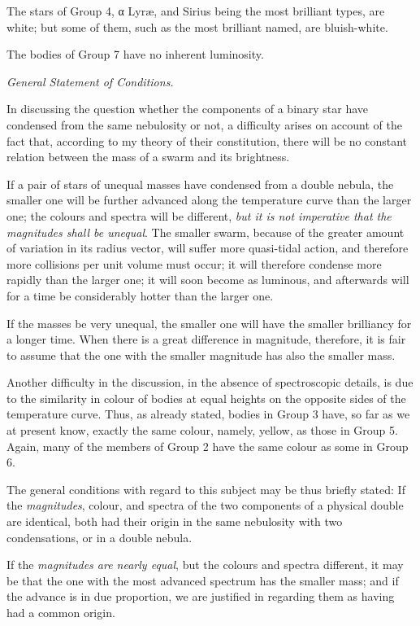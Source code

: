 \documentclass[a4paper, 12pt, oneside, polutonikogreek, english]{article}
\begin{document}
The stars of Group 4, α Lyræ, and Sirius being the most brilliant types, are white; but some of them, such as the most brilliant named, are bluish-white.

The bodies of Group 7 have no inherent luminosity.

\emph{General Statement of Conditions.}

In discussing the question whether the components of a binary star have condensed from the same nebulosity or not, a difficulty arises on account of the fact that, according to my theory of their constitution, there will be no constant relation between the mass of a swarm and its brightness.

If a pair of stars of unequal masses have condensed from a double nebula, the smaller one will be further advanced along the temperature curve than the larger one; the colours and spectra will be different, \emph{but it is not imperative that the magnitudes shall be unequal}. The smaller swarm, because of the greater amount of variation in its radius vector, will suffer more quasi-tidal action, and therefore more collisions per unit volume must occur; it will therefore condense more rapidly than the larger one; it will soon become as luminous, and afterwards will for a time be considerably hotter than the larger one.

If the masses be very unequal, the smaller one will have the smaller brilliancy for a longer time. When there is a great difference in magnitude, therefore, it is fair to assume that the one with the smaller magnitude has also the smaller mass.

Another difficulty in the discussion, in the absence of spectroscopic details, is due to the similarity in colour of bodies at equal heights on the opposite sides of the temperature curve. Thus, as already stated, bodies in Group 3 have, so far as we at present know, exactly the same colour, namely, yellow, as those in Group 5.
Again, many of the members of Group 2 have the same colour as some in Group 6.

The general conditions with regard to this subject may be thus briefly stated: If the \emph{magnitudes}, colour, and spectra of the two components of a physical double are identical, both had their origin in the same nebulosity with two condensations, or in a double nebula.

If the \emph{magnitudes are nearly equal}, but the colours and spectra different, it may be that the one with the most advanced spectrum has the smaller mass; and if the advance is in due proportion, we are justified in regarding them as having had a common origin.
\end{document}
